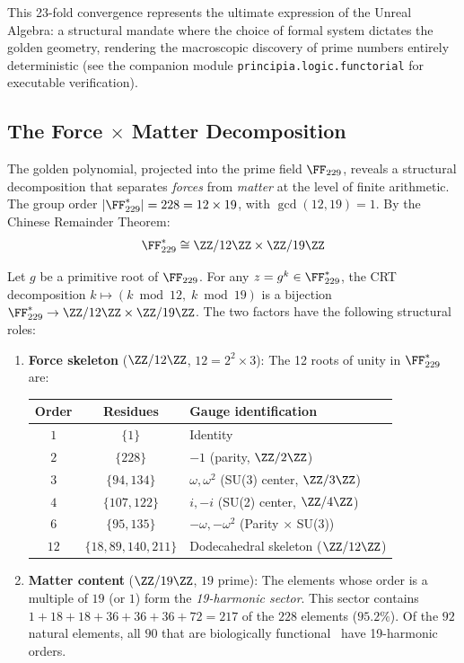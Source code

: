 This 23-fold convergence represents the ultimate expression of the Unreal Algebra: a structural mandate where the choice of formal system dictates the golden geometry, rendering the macroscopic discovery of prime numbers entirely deterministic (see the companion module \texttt{principia.logic.functorial} for executable verification).

\subsection{The Force $\times$ Matter Decomposition}\label{sec:force-matter}

The golden polynomial, projected into the prime field $\FF_{229}$, reveals a structural decomposition that separates \emph{forces} from \emph{matter} at the level of finite arithmetic. The group order $|\FF_{229}^*| = 228 = 12 \times 19$, with $\gcd(12, 19) = 1$. By the Chinese Remainder Theorem:
\begin{equation}\label{eq:crt}
\FF_{229}^* \cong \ZZ/12\ZZ \times \ZZ/19\ZZ
\end{equation}

\begin{theorem}\label{thm:force-matter}
Let $g$ be a primitive root of $\FF_{229}$. For any $z = g^k \in \FF_{229}^*$, the CRT decomposition $k \mapsto (k \bmod 12,\; k \bmod 19)$ is a bijection $\FF_{229}^* \to \ZZ/12\ZZ \times \ZZ/19\ZZ$. The two factors have the following structural roles:
\begin{enumerate}
\item \textbf{Force skeleton} ($\ZZ/12\ZZ$, $12 = 2^2 \times 3$): The 12 roots of unity in $\FF_{229}^*$ are:
\begin{center}
\begin{tabular}{@{}ccl@{}}
\toprule
\textbf{Order} & \textbf{Residues} & \textbf{Gauge identification} \\
\midrule
$1$ & $\{1\}$ & Identity \\
$2$ & $\{228\}$ & $-1$ (parity, $\ZZ/2\ZZ$) \\
$3$ & $\{94, 134\}$ & $\omega, \omega^2$ (SU(3) center, $\ZZ/3\ZZ$) \\
$4$ & $\{107, 122\}$ & $i, -i$ (SU(2) center, $\ZZ/4\ZZ$) \\
$6$ & $\{95, 135\}$ & $-\omega, -\omega^2$ (Parity $\times$ SU(3)) \\
$12$ & $\{18, 89, 140, 211\}$ & Dodecahedral skeleton ($\ZZ/12\ZZ$) \\
\bottomrule
\end{tabular}
\end{center}

\item \textbf{Matter content} ($\ZZ/19\ZZ$, $19$ prime): The elements whose order is a multiple of $19$ (or $1$) form the \emph{19-harmonic sector}. This sector contains $1 + 18 + 18 + 36 + 36 + 36 + 72 = 217$ of the $228$ elements ($95.2\%$). Of the $92$ natural elements, all $90$ that are biologically functional~\cite{FraustoDaSilva2001} have 19-harmonic orders.
\end{enumerate}
\end{theorem}

